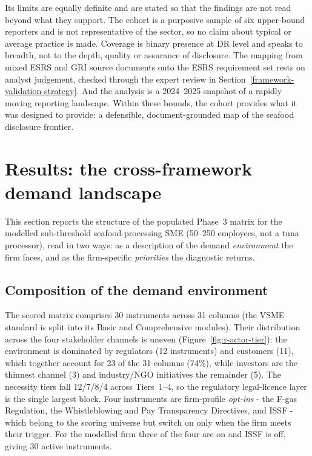\documentclass[
]{article}
\begin{document}
Its limits are equally definite and are stated so that the findings are
not read beyond what they support. The cohort is a purposive sample of six
upper-bound reporters and is not representative of the sector, so no claim
about typical or average practice is made. Coverage is binary presence at
DR level and speaks to breadth, not to the depth, quality or assurance of
disclosure. The mapping from mixed ESRS and GRI source documents onto the
ESRS requirement set rests on analyst judgement, checked through the expert
review in Section~\ref{framework-validation-strategy}. And the analysis is a
2024--2025 snapshot of a rapidly moving reporting landscape. Within these
bounds, the cohort provides what it was designed to provide: a defensible,
document-grounded map of the seafood disclosure frontier.

\section{Results: the cross-framework demand landscape}
\label{results-demand-landscape}

This section reports the structure of the populated Phase~3 matrix for
the modelled sub-threshold seafood-processing SME (50--250 employees,
not a tuna processor), read in two ways: as a description of the demand
\emph{environment} the firm faces, and as the firm-specific
\emph{priorities} the diagnostic returns.

\subsection{Composition of the demand environment}

The scored matrix comprises 30 instruments across 31 columns (the VSME
standard is split into its Basic and Comprehensive modules). Their
distribution across the four stakeholder channels is uneven
(Figure~\ref{fig:r-actor-tier}): the environment is dominated by
regulators (12 instruments) and customers (11), which together account
for 23 of the 31 columns (74\%), while investors are the thinnest channel
(3) and industry/NGO initiatives the remainder (5). The necessity tiers
fall 12/7/8/4 across Tiers~1--4, so the regulatory legal-licence layer is
the single largest block. Four instruments are firm-profile
\emph{opt-ins} - the F-gas Regulation, the Whistleblowing and Pay
Transparency Directives, and ISSF - which belong to the scoring universe
but switch on only when the firm meets their trigger. For the modelled
firm three of the four are on and ISSF is off, giving 30 active
instruments.
\end{document}
